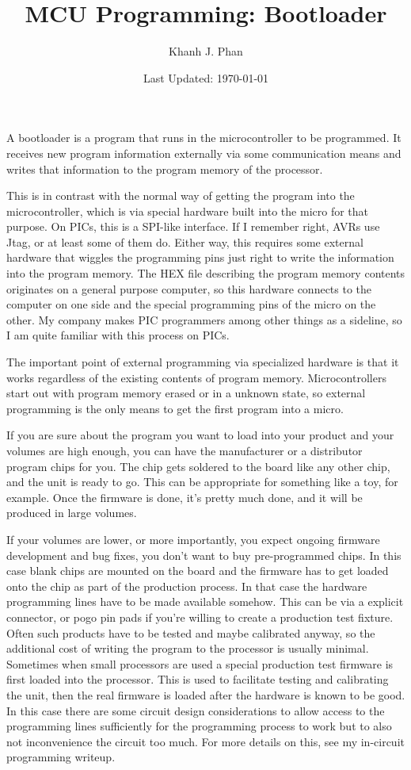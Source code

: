 \documentclass[a4paper]{article}
\title{MCU Programming: Bootloader}
\date{Last Updated: \today}
\author{Khanh J. Phan}
\begin{document}
\pagestyle{fancy} \lhead{} \rhead{}
\maketitle

A bootloader is a program that runs in the microcontroller to be programmed. It
receives new program information externally via some communication means and
writes that information to the program memory of the processor.

This is in contrast with the normal way of getting the program into the
microcontroller, which is via special hardware built into the micro for that
purpose. On PICs, this is a SPI-like interface. If I remember right, AVRs use
Jtag, or at least some of them do. Either way, this requires some external
hardware that wiggles the programming pins just right to write the information
into the program memory. The HEX file describing the program memory contents
originates on a general purpose computer, so this hardware connects to the
computer on one side and the special programming pins of the micro on the other.
My company makes PIC programmers among other things as a sideline, so I am quite
familiar with this process on PICs.

The important point of external programming via specialized hardware is that it
works regardless of the existing contents of program memory. Microcontrollers
start out with program memory erased or in a unknown state, so external
programming is the only means to get the first program into a micro.

If you are sure about the program you want to load into your product and your
volumes are high enough, you can have the manufacturer or a distributor program
chips for you. The chip gets soldered to the board like any other chip, and the
unit is ready to go. This can be appropriate for something like a toy, for
example. Once the firmware is done, it's pretty much done, and it will be
produced in large volumes.

If your volumes are lower, or more importantly, you expect ongoing firmware
development and bug fixes, you don't want to buy pre-programmed chips. In this
case blank chips are mounted on the board and the firmware has to get loaded
onto the chip as part of the production process. In that case the hardware
programming lines have to be made available somehow. This can be via a explicit
connector, or pogo pin pads if you're willing to create a production test
fixture. Often such products have to be tested and maybe calibrated anyway, so
the additional cost of writing the program to the processor is usually minimal.
Sometimes when small processors are used a special production test firmware is
first loaded into the processor. This is used to facilitate testing and
calibrating the unit, then the real firmware is loaded after the hardware is
known to be good. In this case there are some circuit design considerations to
allow access to the programming lines sufficiently for the programming process
to work but to also not inconvenience the circuit too much. For more details on
this, see my in-circuit programming writeup.
\end{document}
